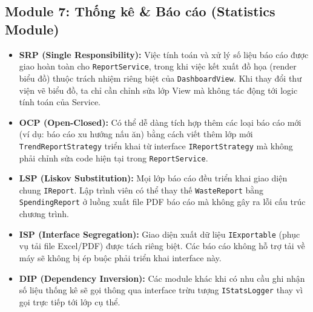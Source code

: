 \documentclass[12pt,a4paper]{article}
\begin{document}
\subsection{Module 7: Thống kê \& Báo cáo (Statistics Module)}
\begin{itemize}
    \item \textbf{SRP (Single Responsibility):} Việc tính toán và xử lý số liệu báo cáo được giao hoàn toàn cho \texttt{ReportService}, trong khi việc kết xuất đồ họa (render biểu đồ) thuộc trách nhiệm riêng biệt của \texttt{DashboardView}. Khi thay đổi thư viện vẽ biểu đồ, ta chỉ cần chỉnh sửa lớp View mà không tác động tới logic tính toán của Service.
    \item \textbf{OCP (Open-Closed):} Có thể dễ dàng tích hợp thêm các loại báo cáo mới (ví dụ: báo cáo xu hướng nấu ăn) bằng cách viết thêm lớp mới \texttt{TrendReportStrategy} triển khai từ interface \texttt{IReportStrategy} mà không phải chỉnh sửa code hiện tại trong \texttt{ReportService}.
    \item \textbf{LSP (Liskov Substitution):} Mọi lớp báo cáo đều triển khai giao diện chung \texttt{IReport}. Lập trình viên có thể thay thế \texttt{WasteReport} bằng \texttt{SpendingReport} ở luồng xuất file PDF báo cáo mà không gây ra lỗi cấu trúc chương trình.
    \item \textbf{ISP (Interface Segregation):} Giao diện xuất dữ liệu \texttt{IExportable} (phục vụ tải file Excel/PDF) được tách riêng biệt. Các báo cáo không hỗ trợ tải về máy sẽ không bị ép buộc phải triển khai interface này.
    \item \textbf{DIP (Dependency Inversion):} Các module khác khi có nhu cầu ghi nhận số liệu thống kê sẽ gọi thông qua interface trừu tượng \texttt{IStatsLogger} thay vì gọi trực tiếp tới lớp cụ thể.
\end{itemize}
\end{document}
